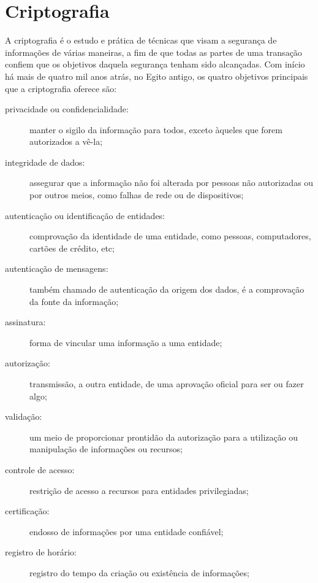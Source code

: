 
\section{Criptografia}

A criptografia é o estudo e prática de técnicas que visam a segurança de informações de
várias maneiras, a fim de que todas as partes de uma transação confiem que os objetivos
daquela segurança tenham sido alcançadas. Com início há mais de quatro mil anos atrás,
no Egito antigo, os quatro objetivos principais que a criptografia oferece são:

\begin{description}
    \item[privacidade ou confidencialidade:] manter o sigilo da informação para todos,
        exceto àqueles que forem autorizados a vê-la;

    \item[integridade de dados:] assegurar que a informação não foi alterada por pessoas
        não autorizadas ou por outros meios, como falhas de rede ou de dispositivos;

    \item[autenticação ou identificação de entidades:] comprovação da identidade de uma
        entidade, como pessoas, computadores, cartões de crédito, etc;

    \item[autenticação de mensagens:] também chamado de autenticação da origem dos
        dados, é a comprovação da fonte da informação;

    \item[assinatura:] forma de vincular uma informação a uma entidade;

    \item[autorização:] transmissão, a outra entidade, de uma aprovação oficial para
        ser ou fazer algo;

    \item[validação:] um meio de proporcionar prontidão da autorização para a
        utilização ou manipulação de informações ou recursos;

    \item[controle de acesso:] restrição de acesso a recursos para entidades
        privilegiadas;

    \item[certificação:] endosso de informações por uma entidade confiável;

    \item[registro de horário:] registro do tempo da criação ou existência de
        informações;


\end{description}
